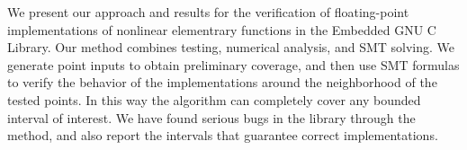 We present our approach and results for the verification of
floating-point implementations of nonlinear elementrary functions in
the Embedded GNU C Library. Our method combines testing, numerical
analysis, and SMT solving. We generate point inputs to obtain
preliminary coverage, and then use SMT formulas to verify the behavior
of the implementations around the neighborhood of the tested points.
In this way the algorithm can completely cover any bounded interval of
interest. We have found serious bugs in the library through the
method, and also report the intervals that guarantee correct
implementations.

